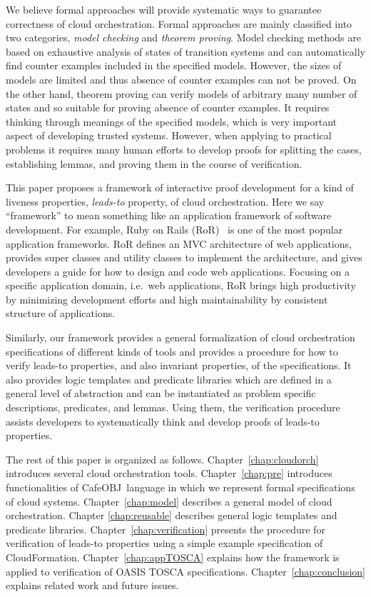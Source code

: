 \documentclass[12pt]{report}
\newcommand{\cafeobj}{{\sf CafeOBJ}~}
\begin{document}
We believe formal approaches will provide systematic ways to guarantee
correctness of cloud orchestration. Formal approaches are mainly
classified into two categories, {\it model checking} and {\it theorem
  proving}. Model checking methods are based on exhaustive analysis of
states of transition systems and can automatically find counter
examples included in the specified models. However, the sizes of models
are limited and thus absence of counter examples can not be proved.
On the other hand, theorem proving can verify models of arbitrary many
number of states and so suitable for proving absence of counter
examples. It requires thinking through meanings of the specified
models, which is very important aspect of developing trusted
systems. However, when applying to practical problems it requires many
human efforts to develop proofs for splitting the cases, establishing
lemmas, and proving them in the course of verification.

This paper proposes a framework of interactive proof development for a
kind of liveness properties, {\it leads-to} property, of cloud
orchestration. Here we say ``framework'' to mean something like an
application framework of software development. For example, Ruby on
Rails (RoR)~\cite{RoR} is one of the most popular application
frameworks. RoR defines an MVC architecture of web applications,
provides super classes and utility classes to implement the
architecture, and gives developers a guide for how to design and code
web applications. Focusing on a specific application domain, i.e.\ web
applications, RoR brings high productivity by minimizing development
efforts and high maintainability by consistent structure of
applications.

Similarly, our framework provides a general formalization of cloud
orchestration specifications of different kinds of tools and provides
a procedure for how to verify leads-to properties, and also invariant
properties, of the specifications. It also provides logic templates
and predicate libraries which are defined in a general level of
abstraction and can be instantiated as problem specific descriptions,
predicates, and lemmas. Using them, the verification procedure assists
developers to systematically think and develop proofs of leads-to
properties.

The rest of this paper is organized as
follows. Chapter~\ref{chap:cloudorch} introduces several cloud
orchestration tools. Chapter~\ref{chap:pre} introduces functionalities
of \cafeobj language in which we represent formal specifications of
cloud systems. Chapter~\ref{chap:model} describes a general model of
cloud orchestration. Chapter \ref{chap:reusable} describes general
logic templates and predicate
libraries. Chapter~\ref{chap:verification} presents the procedure for
verification of leads-to properties using a simple example
specification of CloudFormation. Chapter~\ref{chap:appTOSCA} explains
how the framework is applied to verification of OASIS TOSCA
specifications.  Chapter~\ref{chap:conclusion} explains related work
and future issues.
\end{document}
